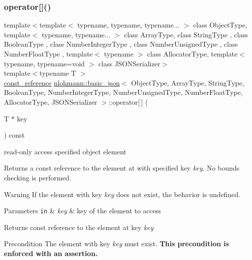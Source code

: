 \subsubsection{\texorpdfstring{operator[]()}{operator[]()}\hspace{0.1cm}{\footnotesize\ttfamily [6/8]}}
{\footnotesize\ttfamily template$<$template$<$ typename, typename, typename... $>$ class Object\+Type, template$<$ typename, typename... $>$ class Array\+Type, class String\+Type , class Boolean\+Type , class Number\+Integer\+Type , class Number\+Unsigned\+Type , class Number\+Float\+Type , template$<$ typename $>$ class Allocator\+Type, template$<$ typename, typename=void $>$ class J\+S\+O\+N\+Serializer$>$ \\
template$<$typename T $>$ \\
\hyperlink{classnlohmann_1_1basic__json_a4057c5425f4faacfe39a8046871786ca}{const\+\_\+reference} \hyperlink{classnlohmann_1_1basic__json}{nlohmann\+::basic\+\_\+json}$<$ Object\+Type, Array\+Type, String\+Type, Boolean\+Type, Number\+Integer\+Type, Number\+Unsigned\+Type, Number\+Float\+Type, Allocator\+Type, J\+S\+O\+N\+Serializer $>$\+::operator\mbox{[}$\,$\mbox{]} (\begin{DoxyParamCaption}\item[{T $\ast$}]{key }\end{DoxyParamCaption}) const\hspace{0.3cm}{\ttfamily [inline]}}



read-\/only access specified object element 

Returns a const reference to the element at with specified key {\itshape key}. No bounds checking is performed.

\begin{DoxyWarning}{Warning}
If the element with key {\itshape key} does not exist, the behavior is undefined.
\end{DoxyWarning}

\begin{DoxyParams}[1]{Parameters}
\mbox{\tt in}  & {\em key} & key of the element to access\\
\hline
\end{DoxyParams}
\begin{DoxyReturn}{Returns}
const reference to the element at key {\itshape key} 
\end{DoxyReturn}
\begin{DoxyPrecond}{Precondition}
The element with key {\itshape key} must exist. {\bfseries This precondition is enforced with an assertion.}
\end{DoxyPrecond}

